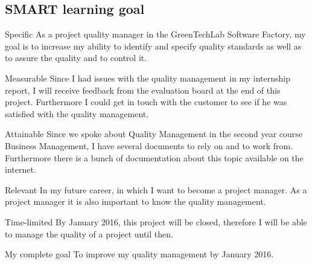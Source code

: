 \documentclass[12pt]{article}
\begin{document}
	\subsection{SMART learning goal}
	\begin{SMART}
	    \item[Specific] As a project quality manager in the GreenTechLab Software Factory, my goal is to increase my ability to identify and specify quality standards as well as to assure the quality and to control it.
	    \item[Measurable] Since I had issues with the quality management in my internship report, I will receive feedback from the evaluation board at the end of this project. Furthermore I could get in touch with the customer to see if he was satisfied with the quality management.
	    \item[Attainable] Since we spoke about Quality Management in the second year course Business Management, I have several documents to rely on and to work from. Furthermore there is a bunch of documentation about this topic available on the internet.
	    \item[Relevant] In my future career, in which I want to become a project manager. As a project manager it is also important to know the quality management.
	    \item[Time-limited]By January 2016, this project will be closed, therefore I will be able to manage the quality of a project until then.
	    \item[My complete goal] To improve my quality management by January 2016.
	\end{SMART}
	
	
\end{document}

